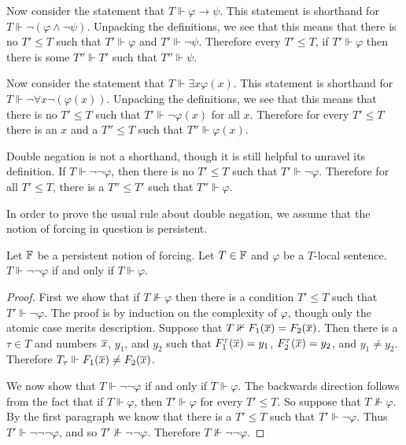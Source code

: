 Now consider the statement that $T\Vdash\varphi\rightarrow \psi$.
This statement is shorthand for $T\Vdash\neg(\varphi\land\neg\psi)$.
Unpacking the definitions, we see that this means that
there is no $T'\leq T$ such that $T'\Vdash\varphi$ and $T'\Vdash\neg\psi$.
Therefore every $T'\leq T$, if $T'\Vdash\varphi$ then
there is some $T''\Vdash T'$ such that $T''\Vdash\psi$.

Now consider the statement that $T\Vdash\exists x\varphi(x)$.
This statement is shorthand for $T\Vdash\neg\forall x\neg(\varphi(x))$.
Unpacking the definitions, we see that this means that
there is no $T'\leq T$ such that $T'\Vdash\neg\varphi(x)$ for all $x$.
Therefore for every $T'\leq T$ there is an $x$ and a $T''\leq T$
such that $T''\Vdash\varphi(x)$.

Double negation is not a shorthand,
though it is still helpful to unravel its definition.
If $T\Vdash\neg\neg\varphi$, then there is no $T'\leq T$
such that $T'\Vdash\neg\varphi$.
Therefore for all $T'\leq T$, there is a $T''\leq T'$
such that $T''\Vdash\varphi$.

In order to prove the usual rule about double negation,
we assume that the notion of forcing in question is persistent.

\begin{prop}[\RCAo]\label{P:2neg}
Let $\mathbb{F}$ be a persistent notion of forcing.
Let $T\in\mathbb{F}$ and $\varphi$ be a $T$-local sentence.
$T\Vdash\neg\neg\varphi$ if and only if $T\Vdash\varphi$.
\end{prop}
\begin{proof}
First we show that if $T\nVdash\varphi$ then there is a condition
$T'\leq T$ such that $T'\Vdash\neg\varphi$.
The proof is by induction on the complexity of $\varphi$,
though only the atomic case merits description.
Suppose that $T\nVdash F_1(\overline{x})=F_2(\overline{x})$.
Then there is a $\tau\in T$ and numbers $\overline{x}$, $y_1$, and $y_2$
such that $F_1^\tau(\overline{x})=y_1$, $F_2^\tau(\overline{x})=y_2$, and $y_1\neq y_2$.
Therefore $T_\tau\Vdash F_1(\overline{x}) \neq F_2(\overline{x})$.

We now show that $T\Vdash\neg\neg\varphi$ if and only if $T\Vdash\varphi$.
The backwards direction follows from the fact that
if $T\Vdash \varphi$, then $T'\Vdash \varphi$ for every $T'\leq T$.
So suppose that $T\nVdash\varphi$.
By the first paragraph we know that there is a
$T'\leq T$ such that $T'\Vdash\neg\varphi$.
Thus $T'\Vdash\neg\neg\neg\varphi$, and so $T'\nVdash\neg\neg\varphi$.
Therefore $T\nVdash\neg\neg\varphi$.
\end{proof}

